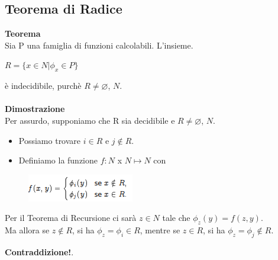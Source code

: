 \subsection{Teorema di Radice}
\textbf{Teorema}\\
Sia P una famiglia di funzioni calcolabili. L’insieme.\\
\begin{center}
    $R = \{x \in N | \phi_x \in P\}$
\end{center}
è indecidibile, purchè $R\neq \varnothing$, $N$.\\\\
\textbf{Dimostrazione}\\
Per assurdo, supponiamo che R sia decidibile e $R \neq \varnothing$, $N$. 
\begin{itemize}
    \item Possiamo trovare $i \in R$ e $j \notin R$.
    
    \item Definiamo la funzione $f : N $ x $N \mapsto N$ con
\end{itemize}
\begin{figure}[htp]
    \centering
    \includegraphics[scale=0.8]{tesi_stile/img/cap6f8.png}
\end{figure}
Per il Teorema di Recursione ci sarà $z \in N$ tale che $\phi_z (y) = f(z,y)$.\\
Ma allora se $z \notin R$, si ha $\phi_z = \phi_i \in R$, mentre se $z \in R$, si ha $\phi_z = \phi_j \notin R$.\\
\begin{center}
    \centering
    \textbf{Contraddizione!}.
\end{center}
\newpage
